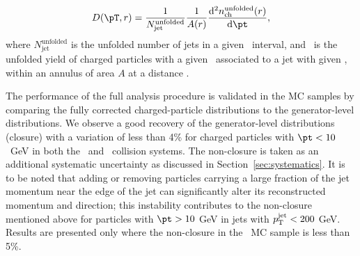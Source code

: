 \begin{align*}
   \Dptr = \frac{1}{N_\mathrm{jet}^\mathrm{unfolded}} \frac{1}{A(r)} \frac{\fd^2 \nchunf(r)}{\fd \pt},
 \end{align*}
where $N_\mathrm{jet}^\mathrm{unfolded}$ is the unfolded number of jets in a given \ptjet\ interval, and \nchunf\  is the unfolded yield of charged particles with a given \pt\ associated to a jet with given \ptjet, within an annulus of area $A$ at a distance \rvar.

The performance of the full analysis procedure is validated in the MC samples by comparing the
fully corrected charged-particle distributions to the generator-level distributions. We observe a 
good recovery of the generator-level distributions (closure) with a variation of less than 4\% for 
charged particles with \mbox{$\pt < 10$ GeV} in both the \pp\ and \pbpb\ collision systems.  The
non-closure is taken as an additional systematic uncertainty as discussed in Section~\ref{sec:systematics}.
It is to be noted that adding or removing particles carrying a large fraction of the jet momentum near the edge of the jet can significantly alter its
reconstructed momentum and direction; this instability contributes to the non-closure mentioned above for particles with $\pt > 10$ GeV in jets with $\mbox{$p_{\mathrm{T}}^{\mathrm{jet}}$} < 200$ GeV. 
Results are presented only where the non-closure in the \pp\ MC sample is less than 5\%.




